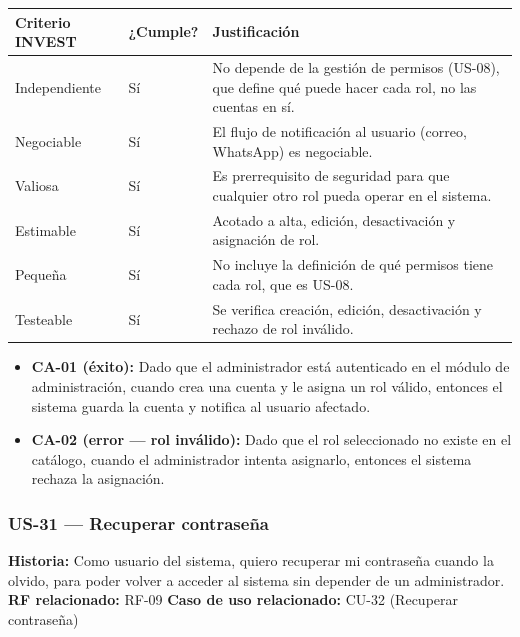 \documentclass[11pt,a4paper]{article}
\providecommand{\tightlist}{%
	\setlength{\itemsep}{0pt}\setlength{\parskip}{0pt}}
\begin{document}
	\begin{longtable}{p{} p{} p{}}
		\toprule
		\textbf{Criterio INVEST} & \textbf{¿Cumple?} & \textbf{Justificación} \\
		\midrule
		\endhead
		Independiente & Sí & No depende de la gestión de permisos (US-08), que define qué puede hacer cada rol, no las cuentas en sí. \\
		Negociable & Sí & El flujo de notificación al usuario (correo, WhatsApp) es negociable. \\
		Valiosa & Sí & Es prerrequisito de seguridad para que cualquier otro rol pueda operar en el sistema. \\
		Estimable & Sí & Acotado a alta, edición, desactivación y asignación de rol. \\
		Pequeña & Sí & No incluye la definición de qué permisos tiene cada rol, que es US-08. \\
		Testeable & Sí & Se verifica creación, edición, desactivación y rechazo de rol inválido. \\
		\bottomrule
	\end{longtable}
	
	\begin{itemize}
		\tightlist
		\item \textbf{CA-01 (éxito):} Dado que el administrador está autenticado en el módulo de administración, cuando crea una cuenta y le asigna un rol válido, entonces el sistema guarda la cuenta y notifica al usuario afectado.
		\item \textbf{CA-02 (error --- rol inválido):} Dado que el rol seleccionado no existe en el catálogo, cuando el administrador intenta asignarlo, entonces el sistema rechaza la asignación.
	\end{itemize}
	
	\subsubsection{US-31 --- Recuperar contraseña}
	
	\textbf{Historia:} Como usuario del sistema, quiero recuperar mi contraseña cuando la olvido, para poder volver a acceder al sistema sin depender de un administrador.
	\textbf{RF relacionado:} RF-09
	\textbf{Caso de uso relacionado:} CU-32 (Recuperar contraseña)
	
\end{document}
